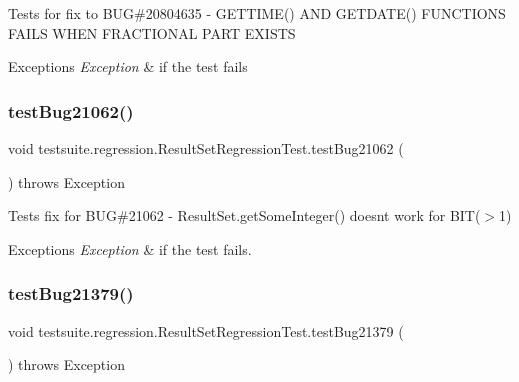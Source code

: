 Tests for fix to B\+UG\#20804635 -\/ G\+E\+T\+T\+I\+M\+E() A\+ND G\+E\+T\+D\+A\+T\+E() F\+U\+N\+C\+T\+I\+O\+NS F\+A\+I\+LS W\+H\+EN F\+R\+A\+C\+T\+I\+O\+N\+AL P\+A\+RT E\+X\+I\+S\+TS


\begin{DoxyExceptions}{Exceptions}
{\em Exception} & if the test fails \\
\hline
\end{DoxyExceptions}
\mbox{\label{classtestsuite_1_1regression_1_1_result_set_regression_test_a18bcdff4c2c8f2245a2e5bb6696e2506}} 
\subsubsection{\texorpdfstring{test\+Bug21062()}{testBug21062()}}
{\footnotesize\ttfamily void testsuite.\+regression.\+Result\+Set\+Regression\+Test.\+test\+Bug21062 (\begin{DoxyParamCaption}{ }\end{DoxyParamCaption}) throws Exception}

Tests fix for B\+UG\#21062 -\/ Result\+Set.\+get\+Some\+Integer() doesn\textquotesingle{}t work for B\+I\+T($>$1)


\begin{DoxyExceptions}{Exceptions}
{\em Exception} & if the test fails. \\
\hline
\end{DoxyExceptions}
\mbox{\label{classtestsuite_1_1regression_1_1_result_set_regression_test_a0e70ddab19727d4cb909e12706e43cff}} 
\subsubsection{\texorpdfstring{test\+Bug21379()}{testBug21379()}}
{\footnotesize\ttfamily void testsuite.\+regression.\+Result\+Set\+Regression\+Test.\+test\+Bug21379 (\begin{DoxyParamCaption}{ }\end{DoxyParamCaption}) throws Exception}


